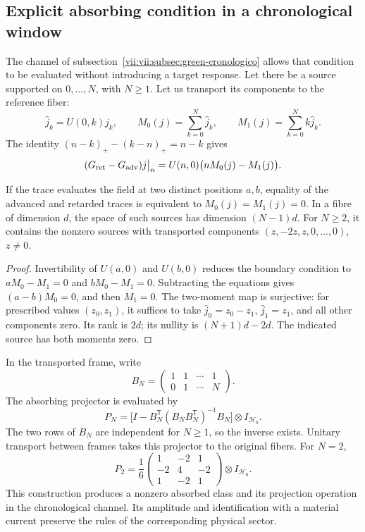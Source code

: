 \subsection{Explicit absorbing condition in a chronological window}
\label{vii:vii:subsec:absorcion-momentos}

The channel of subsection~\ref{vii:vii:subsec:green-cronologico} allows
that condition to be evaluated without introducing a target response. Let there be a
source supported on \(0,\ldots,N\), with \(N\geq1\). Let us transport
its components to the reference fiber:
\[
 \widehat j_k=U(0,k)j_k,\qquad
 M_0(j)=\sum_{k=0}^N\widehat j_k,\qquad
 M_1(j)=\sum_{k=0}^Nk\widehat j_k.
\]
The identity \((n-k)_+-(k-n)_+=n-k\) gives
\begin{equation}
 (G_{\rm ret}-G_{\rm adv})j\big|_n
 =U(n,0)\bigl(nM_0(j)-M_1(j)\bigr).
 \label{vii:vii:eq:diferencia-green-momentos}
\end{equation}

\begin{proposition}
\label{vii:vii:prop:absorcion-momentos}
If the trace evaluates the field at two distinct positions \(a,b\),
equality of the advanced and retarded traces is equivalent to
\(M_0(j)=M_1(j)=0\). In a fibre of dimension \(d\), the space
of such sources has dimension \((N-1)d\). For \(N\geq2\),
it contains the nonzero sources with transported components
\((z,-2z,z,0,\ldots,0)\), \(z\neq0\).
\end{proposition}
\begin{proof}
Invertibility of \(U(a,0)\) and \(U(b,0)\) reduces the boundary
condition to \(aM_0-M_1=0\) and \(bM_0-M_1=0\).
Subtracting the equations gives \((a-b)M_0=0\), and then \(M_1=0\).
The two-moment map is surjective: for prescribed values
\((z_0,z_1)\), it suffices to take
\(\widehat j_0=z_0-z_1\), \(\widehat j_1=z_1\), and all other
components zero. Its rank is \(2d\); its nullity is
\((N+1)d-2d\). The indicated source has both moments zero.
\end{proof}

In the transported frame, write
\[
 B_N=\begin{pmatrix}1&1&\cdots&1\\0&1&\cdots&N\end{pmatrix}.
\]
The absorbing projector is evaluated by
\begin{equation}
 P_N=\bigl[I-B_N^{\mathsf T}(B_NB_N^{\mathsf T})^{-1}B_N\bigr]
       \otimes I_{\mathcal H_0}.
 \label{vii:vii:eq:proyector-momentos-cronologicos}
\end{equation}
The two rows of \(B_N\) are independent for \(N\geq1\), so
the inverse exists. Unitary transport between frames takes this
projector to the original fibers. For \(N=2\),
\[
 P_2=\frac16
 \begin{pmatrix}1&-2&1\\-2&4&-2\\1&-2&1\end{pmatrix}
 \otimes I_{\mathcal H_0}.
\]
This construction produces a nonzero absorbed class and its projection
operation in the chronological channel. Its amplitude and identification with a
material current preserve the rules of the corresponding physical sector.

